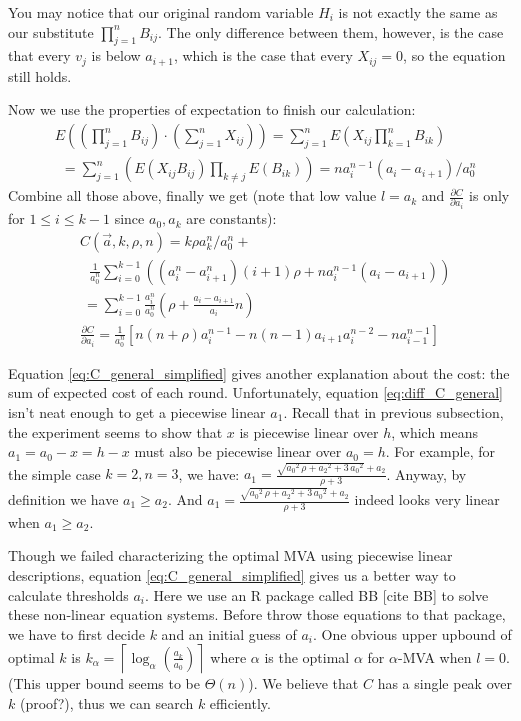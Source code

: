 You may notice that our original random variable $H_i$ is not exactly the same
as our substitute $\prod_{j=1}^n B_{ij}$. The only difference between them,
however, is the case that every $v_j$ is below $a_{i+1}$, which is the case
that every $X_{ij} = 0$, so the equation still holds.

Now we use the properties of expectation to finish our calculation:
\begin{align*}
  &E\left( \left( \prod_{j=1}^n B_{ij} \right) \cdot \left(\sum_{j=1}^n X_{ij}
  \right) \right) = \sum_{j=1}^n E\left( X_{ij} \prod_{k=1}^nB_{ik} \right)
  \\
    &~~ = \sum_{j=1}^n \left( E(X_{ij} B_{ij}) \prod_{k \neq j} E(B_{ik})
    \right)
       = n a_{i}^{n-1} (a_{i}-a_{i+1}) / a_0^n
\end{align*}
Combine all those above, finally we get (note that low value $l = a_k$ and
$\frac{\partial C}{\partial a_i}$ is only for $1 \leq i \leq k-1$ since
$a_0, a_k$ are constants):
\begin{align}
& C(\vec a, k, \rho, n) = k \rho a_k^n / a_0^n + \nonumber\\ 
    &~~~ \frac{1}{a_0^n} \sum_{i=0}^{k-1} \left( (a_{i}^n-a_{i+1}^n) (i+1)
    \rho + n a_{i}^{n-1} (a_{i}-a_{i+1}) \right) \label{eq:C_general} \\
    &~= \sum_{i=0}^{k-1} \frac{a_i^n}{a_0^n} \left( \rho + \frac{a_i-a_{i+1}}{a_{i}} n \right)
    \label{eq:C_general_simplified}\\
& \frac{\partial C}{\partial a_i} = \frac{1}{a_0^n} \left[
	n(n+\rho)a_i^{n-1}-n(n-1)a_{i+1}a_i^{n-2}-n a_{i-1}^{n-1} \right]
	\label{eq:diff_C_general}
\end{align}

Equation \ref{eq:C_general_simplified} gives another explanation about the
cost: the sum of expected cost of each round. Unfortunately, equation
\ref{eq:diff_C_general} isn't neat enough to get a piecewise linear $a_1$.
Recall that in previous subsection, the experiment seems to show that $x$ is
piecewise linear over $h$, which means $a_1 = a_0-x = h-x$ must also be
piecewise linear over $a_0 = h$.  For example, for the simple case $k = 2, n =
3$, we have: $a_1 =
\frac{\sqrt{{a_0}^{2}\,\rho+{a_2}^{2}+3\,{a_0}^{2}}+a_2}{\rho+3}$.  Anyway, by
definition we have $a_1 \geq a_2$. And
$a_1=\frac{\sqrt{{a_0}^{2}\,\rho+{a_2}^{2}+3\,{a_0}^{2}}+a_2}{\rho+3}$ indeed
looks very linear when $a_1 \geq a_2$.

Though we failed characterizing the optimal MVA using piecewise linear
descriptions, equation \ref{eq:C_general_simplified} gives us a better way to
calculate thresholds $a_i$. Here we use an R package called BB [cite BB] to
solve these non-linear equation systems. Before throw those equations to that
package, we have to first decide $k$ and an initial guess of $a_i$.  One
obvious upper upbound of optimal $k$ is $k_\alpha = \left\lceil \log_{\alpha}
\left(\frac{a_k}{a_0}\right) \right\rceil$ where $\alpha$ is the optimal
$\alpha$ for $\alpha$-MVA when $l = 0$.  (This upper bound seems to be
$\Theta(n)$). We believe that $C$ has a single peak over $k$ (proof?), thus we
can search $k$ efficiently.

